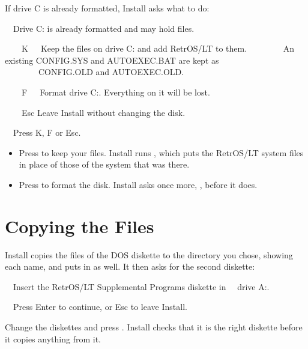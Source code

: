 If drive C is already formatted, Install asks what to do:

\begin{dialogue}
\ \ Drive C: is already formatted and may hold files.

\ \ \ \ K\ \ \ Keep the files on drive C: and add RetrOS/LT to them.
\ \ \ \ \ \ \ \ An existing CONFIG.SYS and AUTOEXEC.BAT are kept as
\ \ \ \ \ \ \ \ CONFIG.OLD and AUTOEXEC.OLD.

\ \ \ \ F\ \ \ Format drive C:. Everything on it will be lost.

\ \ \ \ Esc Leave Install without changing the disk.

\ \ Press K, F or Esc.
\end{dialogue}

\begin{itemize}
\item Press  to keep your files. Install runs , which
  puts the RetrOS/LT system files in place of those of the system that was
  there.
\item Press  to format the disk. Install asks once more,
  , before it does.
\end{itemize}


\section{Copying the Files}

Install copies the files of the DOS diskette to the directory you chose,
showing each name, and puts  in  as well.
It then asks for the second diskette:

\begin{dialogue}
\ \ Insert the RetrOS/LT Supplemental Programs diskette in
\ \ drive A:.

\ \ Press Enter to continue, or Esc to leave Install.
\end{dialogue}

Change the diskettes and press . Install checks that it is the
right diskette before it copies anything from it.

